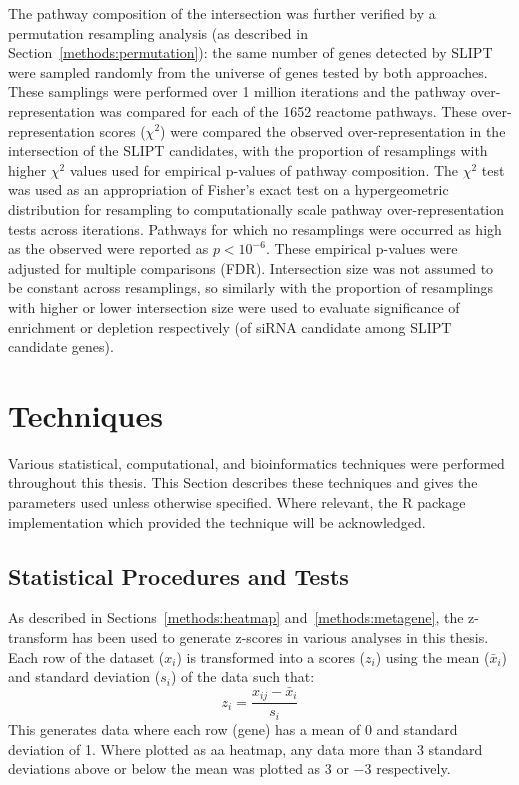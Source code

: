 The \gls{pathway} composition of the intersection was further verified by a permutation resampling analysis (as described in Section~\ref{methods:permutation}): the same number of genes detected by \gls{SLIPT} were sampled randomly from the universe of genes tested by both approaches. These samplings were performed over 1 million iterations and the \gls{pathway} over-representation was compared for each of the 1652 reactome \glspl{pathway}.
These over-representation scores ($\chi^2$) were compared the observed over-representation in the intersection of the \gls{SLIPT} candidates, with the proportion of resamplings with higher $\chi^2$ values used for empirical p-values of \gls{pathway} composition. The $\chi^2$ test was used as an appropriation of Fisher's exact test on a hypergeometric distribution for resampling to computationally scale \gls{pathway} over-representation tests across iterations.  Pathways for which no resamplings were occurred as high as the observed were reported as $p < 10^{-6}$. These empirical p-values were adjusted for multiple comparisons (\gls{FDR}). Intersection size was not assumed to be constant across resamplings, so similarly with the proportion of resamplings with higher or lower intersection size were used to evaluate significance of enrichment or depletion respectively (of \gls{siRNA} candidate among \gls{SLIPT} candidate genes).  

\section{Techniques}
Various statistical, computational, and \gls{bioinformatics} techniques were performed throughout this thesis. This Section describes these techniques and gives the parameters used unless otherwise specified. Where relevant, the R package implementation which provided the technique will be acknowledged. 

\subsection{Statistical Procedures and Tests}

As described in Sections~\ref{methods:heatmap} and~\ref{methods:metagene}, the z-transform has been used to generate z-scores in various analyses in this thesis. Each row of the dataset ($x_i$) is transformed into a scores ($z_i$) using the mean ($\bar{x}_i$) and standard deviation ($s_i$) of the data such that: $$ z_i = \frac{x_{ij} - \bar{x}_i}{s_i} $$
This generates data where each row (gene) has a mean of 0 and standard deviation of 1. Where plotted as aa heatmap, any data more than 3 standard deviations above or below the mean was plotted as $3$ or $-3$ respectively.

